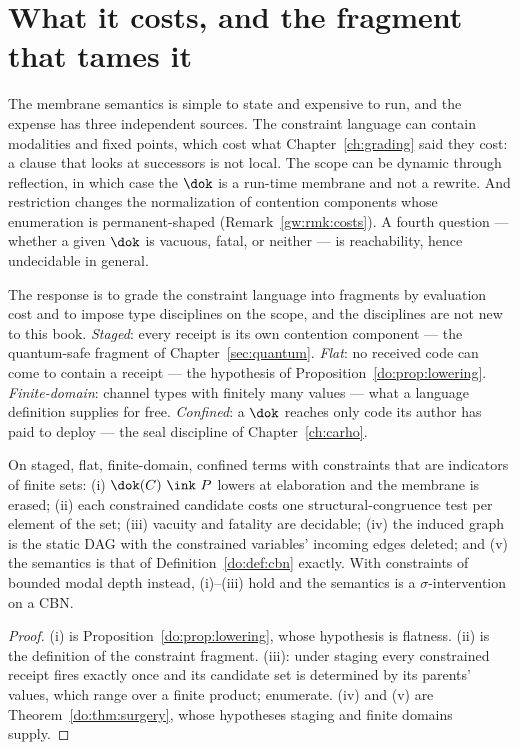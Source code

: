 \section{What it costs, and the fragment that tames it}
\label{do:sec:complexity}

The membrane semantics is simple to state and expensive to run, and the expense has three
independent sources. The constraint language can contain modalities and fixed points, which cost
what Chapter~\ref{ch:grading} said they cost: a clause that looks at successors is not local. The
scope can be dynamic through reflection, in which case the $\dok$ is a run-time membrane and not a
rewrite. And restriction changes the normalization of contention components whose enumeration is
permanent-shaped (Remark~\ref{gw:rmk:costs}). A fourth question --- whether a given $\dok$ is
vacuous, fatal, or neither --- is reachability, hence undecidable in general.

The response is to grade the constraint language into fragments by evaluation cost and to impose
type disciplines on the scope, and the disciplines are not new to this book. \emph{Staged}: every
receipt is its own contention component --- the quantum-safe fragment of Chapter~\ref{sec:quantum}.
\emph{Flat}: no received code can come to contain a receipt --- the hypothesis of
Proposition~\ref{do:prop:lowering}. \emph{Finite-domain}: channel types with finitely many values
--- what a language definition supplies for free. \emph{Confined}: a $\dok$ reaches only code its
author has paid to deploy --- the seal discipline of Chapter~\ref{ch:carho}.

\begin{proposition}
\label{do:prop:practical}
On staged, flat, finite-domain, confined terms with constraints that are indicators of finite sets:
(i) $\dok(C)\ \ink\ P$ lowers at elaboration and the membrane is erased; (ii) each constrained
candidate costs one structural-congruence test per element of the set; (iii) vacuity and fatality
are decidable; (iv) the induced graph is the static DAG with the constrained variables' incoming
edges deleted; and (v) the semantics is that of Definition~\ref{do:def:cbn} exactly. With
constraints of bounded modal depth instead, (i)--(iii) hold and the semantics is a
$\sigma$-intervention on a CBN.
\end{proposition}

\begin{proof}
(i) is Proposition~\ref{do:prop:lowering}, whose hypothesis is flatness. (ii) is the definition
of the constraint fragment. (iii): under staging every constrained receipt fires exactly once and
its candidate set is determined by its parents' values, which range over a finite product;
enumerate. (iv) and (v) are Theorem~\ref{do:thm:surgery}, whose hypotheses staging and finite
domains supply.
\end{proof}

